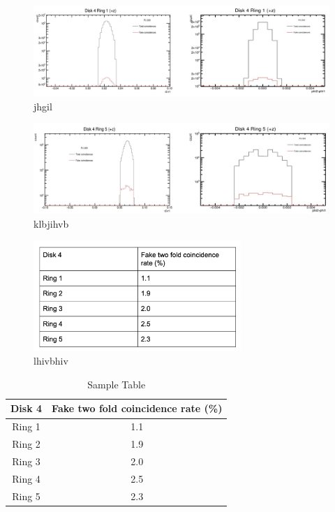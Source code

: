 \begin{figure}[!htp]
\centering
\includegraphics[width=1\textwidth]{ashish_thesis/D4R1_z_dr_dphi_total_fake_twofold.png}
\caption{%
  jhgil
}
\label{fig:cluster_ring}
\end{figure}



\begin{figure}[!htp]
\centering
\includegraphics[width=1\textwidth]{ashish_thesis/D4R5_z_dr_dphi_twofoldcoin_total_fake.png}
\caption{%
   klbjihvb
}
\label{fig:cluster_ring}
\end{figure}



\begin{figure}[!htp]
\centering
\includegraphics[width=0.7\textwidth]{ashish_thesis/fake_rate_D4allring.png}
\caption{%
  lhivbhiv
}
\label{fig:cluster_ring}
\end{figure}


\begin{table}[htbp]
  \centering
  \caption{Sample Table}
  \label{tab:sample}
  \begin{tabular}{cc}
    \textbf{Disk 4} & \textbf{Fake two fold coincidence rate (\%)} \\
    \hline
    Ring 1 &  1.1\\
    Ring 2 &  1.9\\
    Ring 3 &  2.0\\
    Ring 4 &  2.5\\
    Ring 5 &  2.3\\
  \end{tabular}
\end{table}



